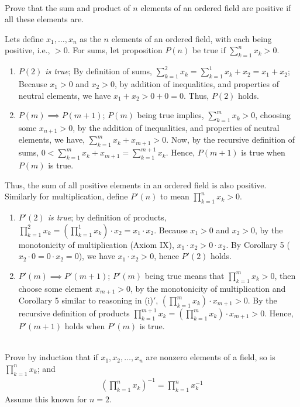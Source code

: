 \documentclass[12pt]{book}
\theoremstyle{definition}
\begin{document}
\begin{ex}[3]
\\
Prove that the sum and product of $n$ elements of an ordered field are positive if all these elements are.
\end{ex}
\begin{sol}
Lets define $x_1,\ldots, x_n$ as the $n$ elements of an ordered field, with each being positive, i.e., $>0$. For sums, let proposition $P(n)$ be true if $\sum_{k=1}^n x_k >0$.
\begin{enumerate}[label = (\roman*)]
	\item \textit{$P(2)$ is true}; By definition of sums, $\sum_{k=1}^2 x_k = \sum_{k=1}^1x_k+x_2= x_1+x_2$; Because $x_1>0$ and $x_2>0$, by addition of inequalities, and properties of neutral elements, we have $x_1+x_2 >0+0=0$. Thus, $P(2)$ holds.
	\item $P(m) \implies P(m+1)$; $P(m)$ being true implies, $\sum_{k=1}^m x_k>0$, choosing some $x_{n+1}>0$, by the addition of inequalities, and properties of neutral elements, we have, $\sum_{k=1}^m x_k +x_{m+1}>0$. Now, by the recursive definition of sums, $0< \sum_{k=1}^m x_k +x_{m+1} = \sum_{k=1}^{m+1}x_k$. Hence, $P(m+1)$ is true when $P(m)$ is true.  	
\end{enumerate}
Thus, the sum of all positive elements in an ordered field is also positive. Similarly for multiplication, define $P'(n)$ to mean $\prod_{k=1}^n x_k>0$.
\begin{enumerate}[label = (\roman*)$'$]
	\item \textit{$P'(2)$ is true}; by definition of products, $\prod_{k=1}^2x_k = (\prod_{k=1}^1x_k)\cdot x_2=x_1\cdot x_2$. Because $x_1>0$ and $x_2>0$, by the monotonicity of multiplication (Axiom IX), $x_1 \cdot x_2 > 0 \cdot x_2$. By  Corollary 5 ($x_2 \cdot 0 = 0 \cdot x_2 =0$), we have $x_1\cdot x_2 >0$, hence $P'(2)$ holds.
	\item $P'(m) \implies P'(m+1)$; $P'(m)$ being true means that $\prod_{k=1}^{m}x_k >0$, then choose some element $x_{m+1}>0$, by the monotonicity of multiplication and Corollary 5 similar to reasoning in (i)$'$, $(\prod_{k=1}^{m}x_k)\cdot x_{m+1} >0$. By the recursive definition of products $\prod_{k=1}^{m+1}x_k =(\prod_{k=1}^{m}x_k)\cdot x_{m+1} >0$. Hence, $P'(m+1)$ holds when $P'(m)$ is true.  	
\end{enumerate}


  	
\end{sol}

\begin{ex}[4]
\\
Prove by induction that if $x_1, x_2, \ldots, x_n$ are nonzero elements of a field, so is $\prod_{k=1}^n x_k$; and
\begin{align*}
	\left(\prod_{k=1}^n x_k \right)^{-1} = \prod_{k=1}^n x_k^{-1}	
\end{align*}
 Assume this known for $n=2$.
\end{ex}
\end{document}
